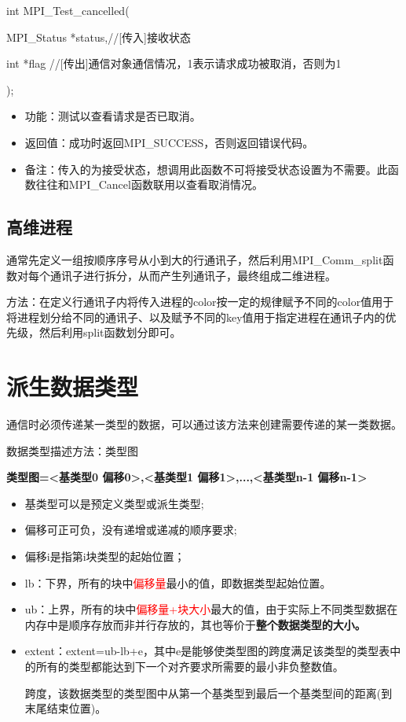 \documentclass[UTF8]{article}%
\begin{document}
int MPI\_Test\_cancelled(

    \qquad MPI\_Status *status,//[传入]接收状态

    \qquad int         *flag //[传出]通信对象通信情况，1表示请求成功被取消，否则为1

);

\begin{itemize}
    \item 功能：测试以查看请求是否已取消。
    \item 返回值：成功时返回MPI\_SUCCESS，否则返回错误代码。
    \item 备注：传入的为接受状态，想调用此函数不可将接受状态设置为不需要。此函数往往和MPI\_Cancel函数联用以查看取消情况。
\end{itemize}

\subsection{高维进程}

通常先定义一组按顺序序号从小到大的行通讯子，然后利用MPI\_Comm\_split函数对每个通讯子进行拆分，从而产生列通讯子，最终组成二维进程。

方法：在定义行通讯子内将传入进程的color按一定的规律赋予不同的color值用于将进程划分给不同的通讯子、以及赋予不同的key值用于指定进程在通讯子内的优先级，然后利用split函数划分即可。

\section{派生数据类型}

通信时必须传递某一类型的数据，可以通过该方法来创建需要传递的某一类数据。

数据类型描述方法：类型图 

\textbf{类型图={<基类型0 偏移0>,<基类型1 偏移1>,...,<基类型n-1 偏移n-1>} }

\begin{itemize}
    \item 基类型可以是预定义类型或派生类型;
    \item 偏移可正可负，没有递增或递减的顺序要求;
    \item 偏移i是指第i块类型的起始位置；
    \item lb：下界，所有的块中\textcolor{red}{偏移量}最小的值，即数据类型起始位置。
    \item ub：上界，所有的块中\textcolor{red}{偏移量+块大小}最大的值，由于实际上不同类型数据在内存中是顺序存放而非并行存放的，其也等价于\textbf{整个数据类型的大小。}
    \item extent：extent=ub-lb+e，其中e是能够使类型图的跨度满足该类型的类型表中的所有的类型都能达到下一个对齐要求所需要的最小非负整数值。
    
    跨度，该数据类型的类型图中从第一个基类型到最后一个基类型间的距离(到末尾结束位置)。

\end{itemize}
\end{document}
